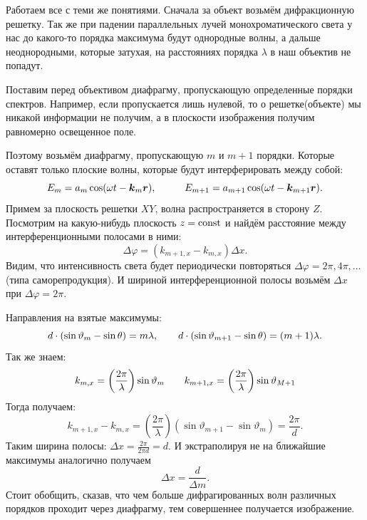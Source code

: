 
Работаем все с теми же понятиями. 
Сначала за объект возьмём дифракционную решетку. 
Так же при падении параллельных лучей монохроматического света у нас до какого-то порядка максимума будут однородные волны, а дальше неоднородными, которые затухая, на расстояниях порядка $\lambda$ в наш объектив не попадут.

Поставим перед объективом диафрагму, пропускающую определенные порядки спектров. Например, если пропускается лишь нулевой, то о решетке(объекте) мы никакой информации не получим, а в плоскости изображения получим равномерно освещенное поле.

Поэтому возьмём диафрагму, пропускающую $m$ и $m+1$ порядки. Которые оставят только плоские волны, которые будут интерферировать между собой:
\begin{equation*}
	E_m = a_m \cos (\omega t - \mbox{\boldmath $k$}_m \mbox{\boldmath $r$}),
	\hspace{1 cm}
	E_{m+1} = a_{m+1} \cos (\omega t - \mbox{\boldmath $k$}_{m+1} \mbox{\boldmath $r$}).
\end{equation*}
Примем за плоскость решетки $XY$, волна распространяется в сторону $Z$. Посмотрим на какую-нибудь плоскость $z = \text{const}$ и найдём расстояние между интерференционными полосами в ними:
\begin{equation*}
	\Delta \varphi = (k_{m+1, x} - k_{m, x}) \Delta x.
\end{equation*}
Видим, что интенсивность света будет периодически повторяться $\Delta \varphi = 2 \pi, 4 \pi, \ldots$ (типа саморепродукция). И шириной интерференционной полосы возьмём $\Delta x$ при $\Delta \varphi = 2 \pi$.

Направления на взятые максимумы:
\begin{equation*}
	d \cdot (\sin \vartheta_m -  \sin \theta) = m \lambda,
	\hspace{0.7 cm}
	d \cdot (\sin \vartheta_{m+1} -  \sin \theta) = (m+1) \lambda.
\end{equation*}
Так же знаем:
\begin{equation*}
	k_{m, x} = \left(\frac{2 \pi}{\lambda}\right) \sin \vartheta_m
	\hspace{0.7 cm}
	k_{m+1, x} = \left(\frac{2 \pi}{\lambda}\right) \sin \vartheta_{M+1}
\end{equation*}
Тогда получаем:
\begin{equation*}
	k_{m+1, x} - k_{m, x} = \left(\frac{2 \pi}{\lambda}\right)(\sin \vartheta_{m+1} - \sin \vartheta_m) = \frac{2 \pi}{d}.
\end{equation*}
Таким ширина полосы: $\Delta x = \frac{2 \pi}{2\pi d} = d$.
И экстраполируя не на ближайшие максимумы аналогично получаем
\begin{equation*}
	\Delta x = \frac{d}{\Delta m}.
\end{equation*}
Стоит обобщить, сказав, что чем больше дифрагированных волн различных порядков проходит через диафрагму, тем совершеннее получается изображение.

